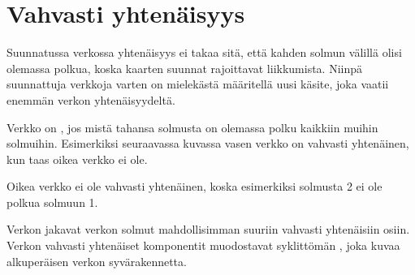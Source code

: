 \chapter{Vahvasti yhtenäisyys}


Suunnatussa verkossa yhtenäisyys ei takaa sitä,
että kahden solmun välillä olisi olemassa polkua,
koska kaarten suunnat rajoittavat liikkumista.
Niinpä suunnattuja verkkoja varten on mielekästä
määritellä uusi käsite,
joka vaatii enemmän verkon yhtenäisyydeltä.

Verkko on ,
jos mistä tahansa solmusta on olemassa polku
kaikkiin muihin solmuihin.
Esimerkiksi seuraavassa kuvassa vasen
verkko on vahvasti yhtenäinen,
kun taas oikea verkko ei ole.

\begin{center}
\end{center}

Oikea verkko ei ole vahvasti yhtenäinen,
koska esimerkiksi solmusta 2 ei ole
polkua solmuun 1.


Verkon 
jakavat verkon solmut mahdollisimman
suuriin vahvasti yhtenäisiin osiin.
Verkon vahvasti yhtenäiset komponentit
muodostavat syklittömän ,
joka kuvaa alkuperäisen verkon syvärakennetta.

